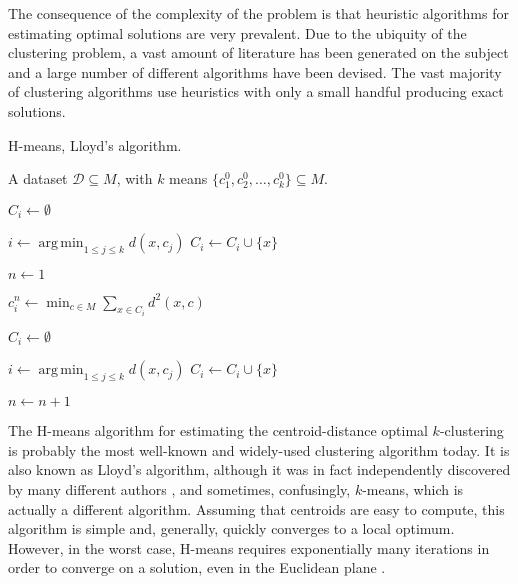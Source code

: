 \documentclass[a4paper]{report}
\DeclareMathOperator*{\argmin}{arg\,min}
\newcommand{\dset}{\mathcal{D}}
\begin{document}
The consequence of the complexity of the problem is that heuristic algorithms
for estimating optimal solutions are very prevalent.  Due to the ubiquity of
the clustering problem, a vast amount of literature has been generated on the
subject and a large number of different algorithms have been devised.  The
vast majority of clustering algorithms use heuristics with only a small
handful producing exact solutions.

\begin{algorithm}
  \caption{H-means, Lloyd's algorithm.}
  \label{alg:lloyds}
  
  \begin{algorithmic}
    \Require A dataset $\dset \subseteq M$, with $k$ means
    $\{c^0_1,c^0_2,\dotsc,c^0_k\} \subseteq M$.

       \State $C_i \gets \emptyset$
    \EndFor

    \ForAll{$x \in \dset$}
       \State $i \gets \argmin_{1 \leq j \leq k} d(x,c_j)$
       \State $C_i \gets C_i \cup \{x\}$
    \EndFor

    \State $n \gets 1$

    \Repeat
       
          \State $c^n_i \gets \min_{c \in M} \sum_{x \in C_i} d^2(x,c)$
       \EndFor

          \State $C_i \gets \emptyset$
       \EndFor
       
       \ForAll{$x \in \dset$}
          \State $i \gets \argmin_{1 \leq j \leq k} d(x,c_j)$
          \State $C_i \gets C_i \cup \{x\}$
       \EndFor

       \State $n \gets n+1$
       

          
       \State {}
  \end{algorithmic}
\end{algorithm}

The H-means algorithm for estimating the centroid-distance optimal
$k$-clustering is probably the most well-known and widely-used clustering
algorithm today.  It is also known as Lloyd's algorithm, although it was in
fact independently discovered by many different authors \citep{jain2010data},
and sometimes, confusingly, $k$-means, which is actually a different
algorithm.  Assuming that centroids are easy to compute, this algorithm is
simple and, generally, quickly converges to a local optimum.  However, in the
worst case, H-means requires exponentially many iterations in order to
converge on a solution, even in the Euclidean plane
\citep{vattani2009exponential}.
\end{document}
